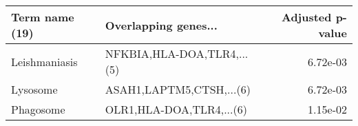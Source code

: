 \begin{tabular}{llr}
\toprule
Term name (19) &       Overlapping genes... &  Adjusted p-value \\
\midrule
 Leishmaniasis & NFKBIA,HLA-DOA,TLR4,...(5) &          6.72e-03 \\
      Lysosome &   ASAH1,LAPTM5,CTSH,...(6) &          6.72e-03 \\
     Phagosome &   OLR1,HLA-DOA,TLR4,...(6) &          1.15e-02 \\
\bottomrule
\end{tabular}
